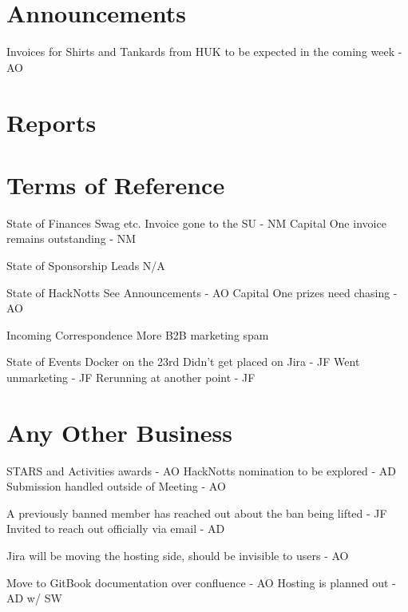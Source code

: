 \documentclass[11pt,hacksoc]{meetingmins}
\begin{document}
\maketitle

\section{Announcements}
\begin{items}
\item Invoices for Shirts and Tankards from HUK to be expected in the coming week - AO
\end{items}

\section{Reports}

\section{Terms of Reference}
\begin{items}
\item {State of Finances}
\subitem Swag etc. Invoice gone to the SU - NM
\subitem Capital One invoice remains outstanding - NM
\item {State of Sponsorship Leads}
\subitem N/A
\item {State of HackNotts}
\subitem See Announcements - AO
\subitem Capital One prizes need chasing - AO
\item {Incoming Correspondence}
\subitem More B2B marketing spam
\item {State of Events}
\subitem Docker on the 23rd 
\subsubitem Didn't get placed on Jira - JF
\subsubitem Went unmarketing - JF
\subsubitem Rerunning at another point - JF
\end{items}

\section{Any Other Business}
\begin{items}
\item STARS and Activities awards - AO
\subitem HackNotts nomination to be explored - AD
\subitem Submission handled outside of Meeting - AO
\item A previously banned member has reached out about the ban being lifted - JF
\subitem Invited to reach out officially via email - AD
\item Jira will be moving the hosting side, should be invisible to users - AO
\item Move to GitBook documentation over confluence - AO
\subitem Hosting is planned out - AD w/ SW
\end{items}

\vspace{1em}
\nextmeeting{}
\end{document}
